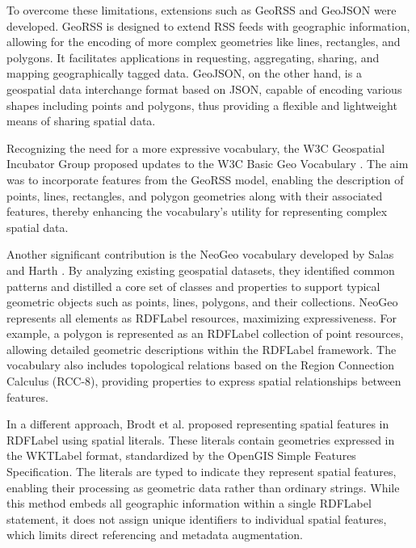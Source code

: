 To overcome these limitations, extensions such as GeoRSS \cite{reedOGCGeoRSSEncoding2017} and GeoJSON \cite{butlerGeoJSONFormat2016} were developed. GeoRSS is designed to extend RSS feeds with geographic information, allowing for the encoding of more complex geometries like lines, rectangles, and polygons. It facilitates applications in requesting, aggregating, sharing, and mapping geographically tagged data. GeoJSON, on the other hand, is a geospatial data interchange format based on JSON, capable of encoding various shapes including points and polygons, thus providing a flexible and lightweight means of sharing spatial data.

Recognizing the need for a more expressive vocabulary, the W3C Geospatial Incubator Group proposed updates to the W3C Basic Geo Vocabulary \cite{joshualiebermanW3CGeospatialVocabulary2017}. The aim was to incorporate features from the GeoRSS model, enabling the description of points, lines, rectangles, and polygon geometries along with their associated features, thereby enhancing the vocabulary's utility for representing complex spatial data.

Another significant contribution is the NeoGeo vocabulary developed by Salas and Harth \cite{salasNeoGeoVocabularyDefining2011a}. By analyzing existing geospatial datasets, they identified common patterns and distilled a core set of classes and properties to support typical geometric objects such as points, lines, polygons, and their collections. NeoGeo represents all elements as \acrshort{RDFLabel} resources, maximizing expressiveness. For example, a polygon is represented as an \acrshort{RDFLabel} collection of point resources, allowing detailed geometric descriptions within the \acrshort{RDFLabel} framework. The vocabulary also includes topological relations based on the Region Connection Calculus (RCC-8), providing properties to express spatial relationships between features.

In a different approach, Brodt et al. \cite{brodtDeepIntegrationSpatial2010} proposed representing spatial features in \acrshort{RDFLabel} using spatial literals. These literals contain geometries expressed in the \acrshort{WKTLabel} format, standardized by the OpenGIS Simple Features Specification. The literals are typed to indicate they represent spatial features, enabling their processing as geometric data rather than ordinary strings. While this method embeds all geographic information within a single \acrshort{RDFLabel} statement, it does not assign unique identifiers to individual spatial features, which limits direct referencing and metadata augmentation.

